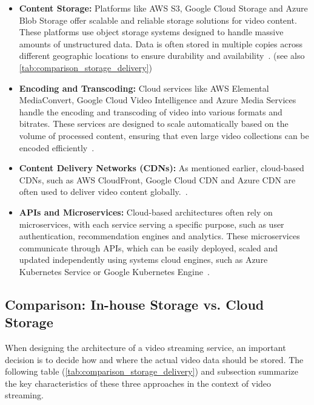 \begin{itemize}
    \item \textbf{Content Storage:} Platforms like \ac{AWS} S3, Google Cloud Storage and Azure Blob Storage offer scalable and reliable storage solutions for video content. These platforms use object storage systems designed to handle massive amounts of unstructured data. Data is often stored in multiple copies across different geographic locations to ensure durability and availability~\parencite{cloud_streaming}. (see also \autoref{tab:comparison_storage_delivery})
    
    \item \textbf{Encoding and Transcoding:} Cloud services like \ac{AWS} Elemental MediaConvert, Google Cloud Video Intelligence and Azure Media Services handle the encoding and transcoding of video into various formats and bitrates. These services are designed to scale automatically based on the volume of processed content, ensuring that even large video collections can be encoded efficiently~\parencite{cloud_streaming}.
    
    \item \textbf{Content Delivery Networks (CDNs):} As mentioned earlier, cloud-based \ac{CDN}s, such as \ac{AWS} CloudFront, Google Cloud CDN and Azure CDN are often used to deliver video content globally.~\parencite{cloud_streaming}.
    
    \item \textbf{\ac{API}s and Microservices:} Cloud-based architectures often rely on microservices, with each service serving a specific purpose, such as user authentication, recommendation engines and analytics. These microservices communicate through \ac{API}s, which can be easily deployed, scaled and updated independently using systems cloud engines, such as Azure Kubernetes Service or Google Kubernetes Engine~\parencite{cloud_streaming}.
\end{itemize}

\subsection{Comparison: In-house Storage vs. Cloud Storage}

When designing the architecture of a video streaming service, an important decision is to decide how and where the actual video data should be stored. The following table (\autoref{tab:comparison_storage_delivery}) and subsection summarize the key characteristics of these three approaches in the context of video streaming. 

